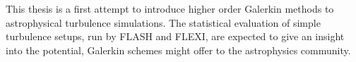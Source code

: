This thesis is a first attempt to introduce higher order Galerkin methods to
astrophysical turbulence simulations. The statistical evaluation of simple
turbulence setups, run by FLASH and FLEXI, are expected to give an insight into
the potential, Galerkin schemes might offer to the astrophysics community.

\newpage
